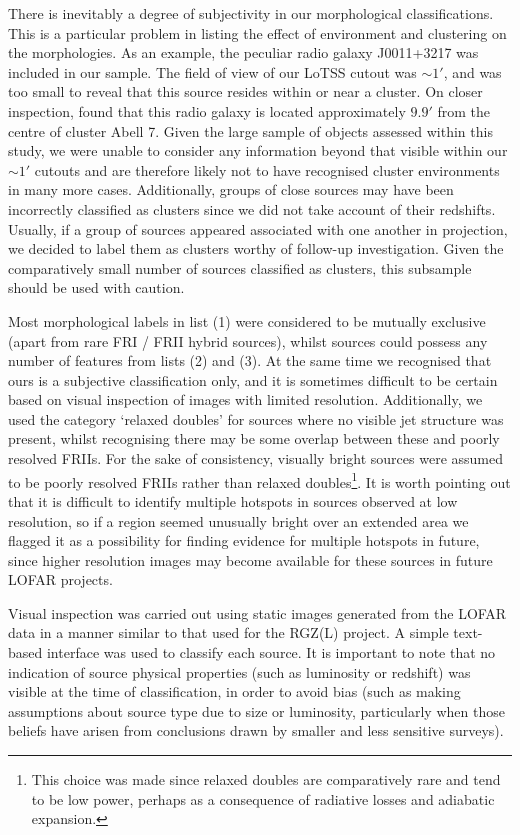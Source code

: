 \documentclass{aa}
\begin{document}
There is inevitably a degree of subjectivity in our morphological classifications. This is a particular problem in listing the effect of environment and clustering on the morphologies.   As an example, the peculiar radio galaxy J0011+3217 \citep{shobha24} was included in our sample. The field of view of our LoTSS cutout was $\sim 1'$, and was too small to reveal that this source resides within or near a cluster. On closer inspection, \cite{shobha24} found that this radio galaxy is located approximately $9.9'$ from the centre of cluster Abell 7. Given the large sample of objects assessed within this study, we were unable to consider any information beyond that visible within our $\sim 1'$ cutouts and are therefore likely not to have recognised cluster environments in many more cases.  Additionally, groups of close sources may have been incorrectly classified as clusters since we did not take account of their redshifts. Usually, if a group of sources appeared associated with one another in projection, we decided to label them as clusters worthy of follow-up investigation. Given the comparatively small number of sources classified as clusters, this subsample should be used with caution.

Most morphological labels in list (1) were considered to be mutually exclusive (apart from rare FRI / FRII hybrid sources), whilst sources could possess any number of features from lists (2) and (3). At the same time we recognised that ours is a subjective classification only, and it is sometimes difficult to be certain based on visual inspection of images with limited resolution. Additionally, we used the category `relaxed doubles' for sources where no visible jet structure was present, whilst recognising there may be some overlap between these and poorly resolved FRIIs. For the sake of consistency, visually bright sources were assumed to be poorly resolved FRIIs rather than relaxed doubles\footnote{This choice was made since relaxed doubles are comparatively rare \citep[e.g.,][]{mahatma23} and tend to be low power, perhaps as a consequence of radiative losses and adiabatic expansion.}. It is worth pointing out that it is difficult to identify multiple hotspots in sources observed at low resolution, so if a region seemed unusually bright over an extended area we flagged it as a possibility for finding evidence for multiple hotspots in future, since higher resolution images may become available for these sources in future LOFAR projects. 

Visual inspection was carried out using static images generated from the LOFAR data in a manner similar to that used for the RGZ(L) project. A simple text-based interface was used to classify each source. It is important to note that no indication of source physical properties (such as luminosity or redshift) was visible at the time of classification, in order to avoid bias (such as making assumptions about source type due to size or luminosity, particularly when those beliefs have arisen from conclusions drawn by smaller and less sensitive surveys).
\end{document}
